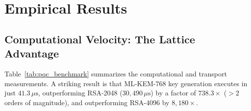 \documentclass[10pt,twocolumn,a4paper]{article}
\begin{document}
\begin{table}[t]
\centering
\small
\caption{\textbf{Empirical performance and network wire overhead across classical and post-quantum key exchange mechanisms.} Timings measured with compiled C-extensions across independent trials. Wire sizes evaluate raw KEM exchange, RFC 8446 \texttt{ClientHello} flight, and TCP segment counts over standard $1{,}460$-byte Ethernet MSS.}
\label{tab:pqc_benchmark}
\end{table}

\section{Empirical Results}

\subsection{Computational Velocity: The Lattice Advantage}
Table~\ref{tab:pqc_benchmark} summarizes the computational and transport measurements. A striking result is that ML-KEM-768 key generation executes in just $41.3\,\mu\mathrm{s}$, outperforming RSA-2048 ($30{,}490\,\mu\mathrm{s}$) by a factor of $738.3\times$ ($> 2$ orders of magnitude), and outperforming RSA-4096 by $8{,}180\times$. 
\end{document}
